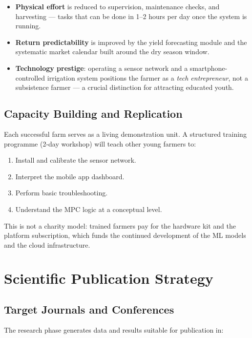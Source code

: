 \documentclass[12pt, a4paper]{report}
\begin{document}
\begin{itemize}[leftmargin=2em]
  \item \textbf{Physical effort} is reduced to supervision, maintenance checks, and harvesting — tasks that can be done in 1–2 hours per day once the system is running.
  \item \textbf{Return predictability} is improved by the yield forecasting module and the systematic market calendar built around the dry season window.
  \item \textbf{Technology prestige}: operating a sensor network and a smartphone-controlled irrigation system positions the farmer as a \textit{tech entrepreneur}, not a subsistence farmer — a crucial distinction for attracting educated youth.
\end{itemize}

\section{Capacity Building and Replication}

Each successful farm serves as a living demonstration unit. A structured training programme (2-day workshop) will teach other young farmers to:
\begin{enumerate}[leftmargin=2em]
  \item Install and calibrate the sensor network.
  \item Interpret the mobile app dashboard.
  \item Perform basic troubleshooting.
  \item Understand the MPC logic at a conceptual level.
\end{enumerate}

This is not a charity model: trained farmers pay for the hardware kit and the platform subscription, which funds the continued development of the ML models and the cloud infrastructure.

\chapter{Scientific Publication Strategy}

\section{Target Journals and Conferences}

The research phase generates data and results suitable for publication in:
\end{document}
